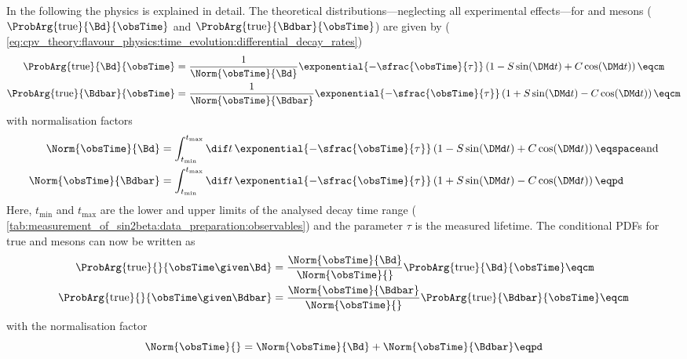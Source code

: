 In the following the \B physics \PDF is explained in detail. The theoretical
distributions---neglecting all experimental effects---for \Bd and \Bdbar mesons
($\ProbArg{\text{true}}{\Bd}{\obsTime}$ and
$\ProbArg{\text{true}}{\Bdbar}{\obsTime}$) are given by (\cf
\cref{eq:cpv_theory:flavour_physics:time_evolution:differential_decay_rates})
%
\begin{equation}
  \begin{split}
    \ProbArg{\text{true}}{\Bd}{\obsTime}    &= \frac{1}{\Norm{\obsTime}{\Bd}}    \exponential{-\sfrac{\obsTime}{\tau}} \left( 1 - S \sin(\DMd t) + C \cos (\DMd t) \right)\eqcm \\
    \ProbArg{\text{true}}{\Bdbar}{\obsTime} &= \frac{1}{\Norm{\obsTime}{\Bdbar}} \exponential{-\sfrac{\obsTime}{\tau}} \left( 1 + S \sin(\DMd t) - C \cos (\DMd t) \right)\eqcm
  \end{split}
\end{equation}
%
with normalisation factors
%
\begin{equation}
  \begin{split}
    \Norm{\obsTime}{\Bd}    &= \int_{t_\text{min}}^{t_\text{max}} \dif t \, \exponential{-\sfrac{\obsTime}{\tau}} \left( 1 - S \sin (\DMd t) + C \cos (\DMd t) \right)\eqspace\text{and} \\
    \Norm{\obsTime}{\Bdbar} &= \int_{t_\text{min}}^{t_\text{max}} \dif t \, \exponential{-\sfrac{\obsTime}{\tau}} \left( 1 + S \sin (\DMd t) - C \cos (\DMd t) \right)\eqpd
  \end{split}
\end{equation}
%
Here, $t_\text{min}$ and $t_\text{max}$ are the lower and upper limits of the
analysed decay time range (\cf
\cref{tab:measurement_of_sin2beta:data_preparation:observables}) and the parameter $\tau$ is the measured \Bd
lifetime. The conditional \acp{PDF} for true \Bd and \Bdbar mesons can now be
written as
%
\begin{equation}
  \begin{split}
    \ProbArg{\text{true}}{}{\obsTime\given\Bd}    &= \frac{\Norm{\obsTime}{\Bd}}{\Norm{\obsTime}{}}    \ProbArg{\text{true}}{\Bd}{\obsTime}\eqcm \\
    \ProbArg{\text{true}}{}{\obsTime\given\Bdbar} &= \frac{\Norm{\obsTime}{\Bdbar}}{\Norm{\obsTime}{}} \ProbArg{\text{true}}{\Bdbar}{\obsTime}\eqcm
  \end{split}
\end{equation}
%
with the normalisation factor
%
\begin{equation}
  \Norm{\obsTime}{} = \Norm{\obsTime}{\Bd} + \Norm{\obsTime}{\Bdbar}\eqpd
\end{equation}
